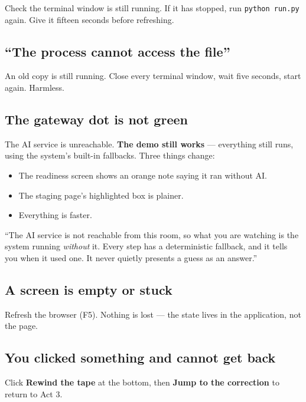 \documentclass[11pt,a4paper]{article}
\newcommand{\ui}[1]{\textbf{#1}}          %
\newcommand{\key}[1]{\textsf{\small #1}}  %
\begin{document}
Check the terminal window is still running. If it has stopped, run
\texttt{python run.py} again. Give it fifteen seconds before refreshing.

\subsection{``The process cannot access the file''}

An old copy is still running. Close every terminal window, wait five seconds,
start again. Harmless.

\subsection{The gateway dot is not green}
\label{sec:nogateway}

The AI service is unreachable. \textbf{The demo still works} --- everything
still runs, using the system's built-in fallbacks. Three things change:

\begin{itemize}[leftmargin=*]
  \item The readiness screen shows an orange note saying it ran without AI.
  \item The staging page's highlighted box is plainer.
  \item Everything is faster.
\end{itemize}

\begin{say}
``The AI service is not reachable from this room, so what you are watching is
the system running \emph{without} it. Every step has a deterministic fallback,
and it tells you when it used one. It never quietly presents a guess as an
answer.''
\end{say}

\subsection{A screen is empty or stuck}

Refresh the browser (\key{F5}). Nothing is lost --- the state lives in the
application, not the page.

\subsection{You clicked something and cannot get back}

Click \ui{Rewind the tape} at the bottom, then \ui{Jump to the correction} to
return to Act 3.
\end{document}
